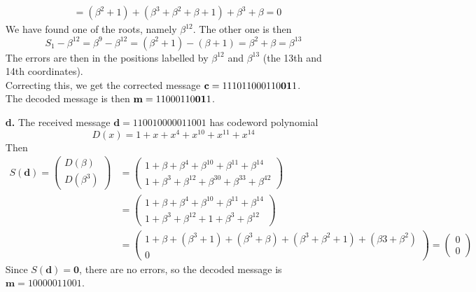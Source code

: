 \documentclass[11pt]{article}
\renewcommand{\vec}[1]{\mathbf{#1}}
\newcommand{\vc}[1]{\begin{pmatrix}#1\end{pmatrix}}
\begin{document}
\begin{itemize}
\begin{align*}
                     &= (\beta^2+1) + (\beta^3+\beta^2+\beta+1) + \beta^3 + \beta
                      =  0
                    \end{align*}
                   We have found one of the roots, namely $\beta^{12}$.
                   The other one is then
                   \[
                     S_1 - \beta^{12} = \beta^9-\beta^{12}
                                      = (\beta^2+1) - (\beta+1)
                                      = \beta^2+\beta
                                      = \beta^{13}
                   \]
                   The errors are then in the positions labelled by $\beta^{12}$ and $\beta^{13}$
                   (the 13th and 14th coordinates).\\
                   Correcting this, we get the corrected message
                   $\vec{c} = \text{111011000110\textbf{01}1}$.\\
                   The decoded message is then $\vec{m} = \text{11000110\textbf{01}1}$.
      \item[{\bf d.}] The received message     $\vec{d} = \text{110010000011001}$
                   has codeword polynomial
                   \[
                     D(x) = 1 + x + x^4 + x^{10} + x^{11} + x^{14}
                   \]
                   Then
                   \begin{align*}
                     S(\vec{d}) = \vc{D(\beta)\\
                                      D(\beta^3)}
                               &= \vc{1 + \beta   + \beta^4    + \beta^{10} + \beta^{11} + \beta^{14} \\
                                      1 + \beta^3 + \beta^{12} + \beta^{30} + \beta^{33} + \beta^{42}}\\
                               &= \vc{1 + \beta   + \beta^4    + \beta^{10} + \beta^{11} + \beta^{14} \\
                                      1 + \beta^3 + \beta^{12} +      1     + \beta^3    + \beta^{12}}\\
                               &= \vc{1 + \beta   + (\beta^3+1)+(\beta^3+\beta) + (\beta^3+\beta^2+1) + (\beta3+\beta^2) \\
                                      0}
                                = \vc{0\\
                                      0}
                   \end{align*}
                   Since $S(\vec{d}) = \vec{0}$, there are no errors,
                   so the decoded message is $\vec{m} = \text{10000011001}$.
\end{itemize}
\end{document}
